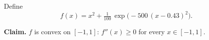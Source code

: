 \begin{problem}
Define
\[
  f(x) = x^{2} + \tfrac{1}{100}\,\exp\!\bigl(-500\,(x - 0.43)^{2}\bigr).
\]

\textbf{Claim.} $f$ is convex on $[-1, 1]$: $f''(x) \geq 0$ for
every $x \in [-1, 1]$.
\end{problem}
